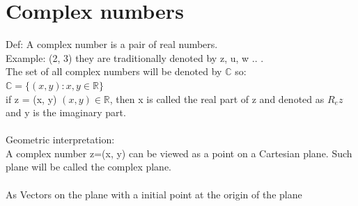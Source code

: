 \documentclass{article}
\begin{document}
\section{Complex numbers}
Def: A complex number is a pair of real numbers.\\
Example: (2, 3) they are traditionally denoted by z, u, w .. . \\
The set of all complex numbers will be denoted by $\mathbb{C}$ so: \\
$\mathbb{C} = \{(x, y): x, y \in \mathbb{R} \}$ \\
if z = (x, y) $(x, y) \in \mathbb{R}$, then x is called the real part of z and denoted as $R_ez$ and y is the imaginary part.\\ \\
Geometric interpretation: \\
A complex number z=(x, y) can be viewed as a point on a Cartesian plane. Such plane will be called the complex plane. \\ \\
As Vectors on the plane with a initial point at the origin of the plane \\ \\
\end{document}
